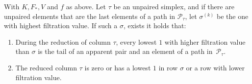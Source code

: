 \begin{lemma}
\label{lem:lowest_apparent}
With $K,F_*,V$ and $f$ as above. Let $\tau$ be an unpaired simplex, and if there are unpaired elements that are the last elements of a path in $\mathcal{P}_\tau$, let $\sigma^{(k)}$ be the one with highest filtration value. If such a $\sigma$, exists it holds that:
\begin{enumerate}[{(}1{)}]
\item During the reduction of column $\tau$, every lowest $1$ with higher filtration value than $\sigma$ is the tail of an apparent pair and an element of a path in~$\mathcal{P}_\tau$.
\item The reduced column $\tau$ is zero or has a lowest $1$ in row $\sigma$ or a row with lower filtration value.
\end{enumerate}


\end{lemma}
